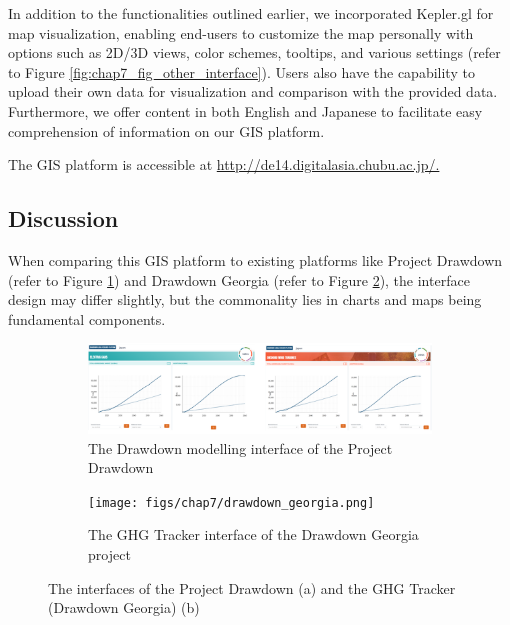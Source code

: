 In addition to the functionalities outlined earlier, we incorporated Kepler.gl for map visualization, enabling end-users to customize the map personally with options such as 2D/3D views, color schemes, tooltips, and various settings (refer to Figure \ref{fig:chap7_fig_other_interface}). Users also have the capability to upload their own data for visualization and comparison with the provided data. Furthermore, we offer content in both English and Japanese to facilitate easy comprehension of information on our GIS platform. \par

The GIS platform is accessible at \url{http://de14.digitalasia.chubu.ac.jp/.}\par


\subsection{Discussion}

When comparing this GIS platform to existing platforms like Project Drawdown (refer to Figure \ref{fig:chap7_fig_other_gis_a}) and Drawdown Georgia \citep{brown2022carbon, brown2021translating} (refer to Figure \ref{fig:chap7_fig_other_gis_b}), the interface design may differ slightly, but the commonality lies in charts and maps being fundamental components.\par

\begin{figure}[tbh!]
  \centering
  \begin{subfigure}{\textwidth}
      \centering
      \includegraphics[width=.9\textwidth]{figs/chap7/project_drawdown.png}
      \caption{The Drawdown modelling interface of the Project Drawdown}
      \label{fig:chap7_fig_other_gis_a}
  \end{subfigure}

  \begin{subfigure}{\textwidth}
      \centering
      \texttt{[image: figs/chap7/drawdown\_georgia.png]}
      \caption{The GHG Tracker interface of the Drawdown Georgia project}
      \label{fig:chap7_fig_other_gis_b}
  \end{subfigure}
  \caption[Comparison with other platforms]{The interfaces of the Project Drawdown (a) and the GHG Tracker (Drawdown Georgia) (b)}
  \label{fig:chap7_fig_other_gis}
\end{figure}

